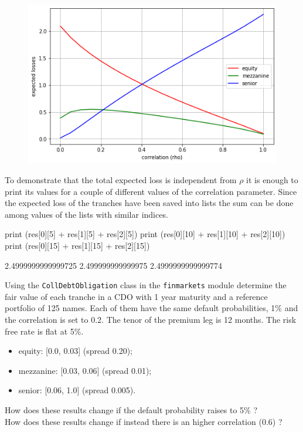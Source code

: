 \begin{figure}[htbp]
	\begin{center}		
\includegraphics[width=0.7\linewidth]{figures/losses_vs_rho_2}
\end{center}
\end{figure}
To demonstrate that the total expected loss is independent from $\rho$ it is enough to print its values for a couple of different values of the correlation parameter. Since the expected loss of the tranches have been saved into lists the sum can be done among values of the lists with similar indices. 

\begin{ipython}
print (res[0][5] + res[1][5] + res[2][5])
print (res[0][10] + res[1][10] + res[2][10])
print (res[0][15] + res[1][15] + res[2][15])

2.4999999999999725
2.499999999999975
2.4999999999999774
\end{ipython}

\begin{question}
Using the \texttt{CollDebtObligation} class in the \texttt{finmarkets} module determine the fair value of each tranche in a CDO with 1 year maturity and a reference portfolio of 125 names. Each of them have the same default probabilities, 1\% and the correlation is set to 0.2. The tenor of the premium leg is 12 months. The risk free rate is flat at 5\%.
\begin{itemize}
	\item equity: [0.0, 0.03] (spread 0.20);
	\item mezzanine: [0.03, 0.06] (spread 0.01);
	\item senior: [0.06, 1.0] (spread 0.005).
\end{itemize}
How does these results change if the default probability raises to 5\% ? \\
How does these results change if instead there is an higher correlation (0.6) ?
\end{question}

